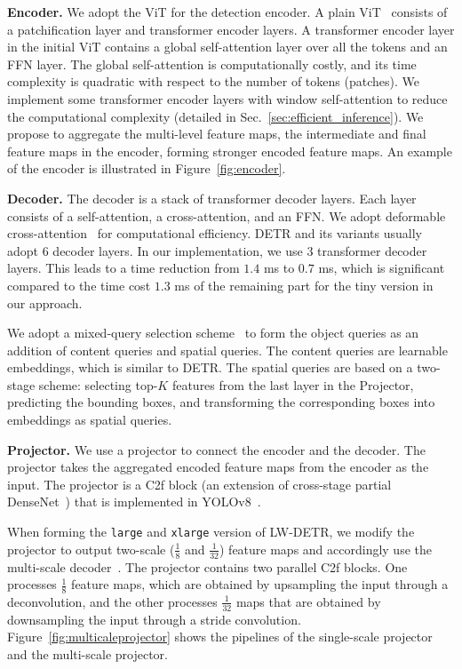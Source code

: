 \documentclass[runningheads]{llncs}
\begin{document}
\vspace{1mm}
\noindent\textbf{Encoder.} We adopt the ViT 
for the detection encoder. A plain ViT~\cite{dosovitskiy2020image} consists of a patchification layer and transformer encoder layers. 
A transformer encoder layer in the initial ViT contains a global self-attention layer over all the tokens and an FFN layer. 
The global self-attention is computationally costly, and its time complexity is quadratic with respect to the number of tokens (patches). We implement some transformer encoder layers with window self-attention to reduce the computational complexity (detailed in Sec.~\ref{sec:efficient_inference}). 
We propose to aggregate the multi-level feature maps, the intermediate and final feature maps in the encoder, forming stronger encoded feature maps. An example of the encoder is illustrated in Figure~\ref{fig:encoder}.

\vspace{1mm}
\noindent\textbf{Decoder.} 
The decoder is a stack of transformer decoder layers. Each layer consists of a self-attention, a cross-attention, and an FFN. 
We adopt deformable cross-attention~\cite{zhu2020deformable} for computational efficiency. 
DETR and its variants usually adopt $6$ decoder layers. In our implementation, we use $3$ transformer decoder layers. 
This leads to a time reduction from $1.4$ ms to $0.7$ ms, 
which is significant compared to the time cost $1.3$ ms of the remaining part for the tiny version in our approach.

We adopt a mixed-query selection scheme~\cite{zhang2022dino} to form the object queries as an addition of content queries and spatial queries. The content queries are learnable embeddings, which is similar to DETR. 
The spatial queries are based 
on a two-stage scheme: selecting top-$K$ features 
from the last layer in the Projector, predicting the bounding boxes,  
and transforming the corresponding boxes into embeddings as spatial queries.

\vspace{1mm}
\noindent\textbf{Projector.} We use a projector to connect the encoder and the decoder. The projector takes the aggregated encoded feature maps from the encoder as the input. The projector is a C2f block (an extension of cross-stage partial DenseNet~\cite{huang2017densely,wang2020cspnet}) that is implemented in YOLOv8~\cite{yolov8_ultralytics}.

When forming the \texttt{large} and \texttt{xlarge} version of LW-DETR, we modify the projector to output two-scale ($\frac{1}{8}$ and $\frac{1}{32}$) feature maps and accordingly use the multi-scale decoder~\cite{zhu2020deformable}. The projector contains two parallel C2f blocks. One processes $\frac{1}{8}$ feature maps, which are obtained by upsampling the input through a deconvolution, and the other processes $\frac{1}{32}$ maps that are obtained by downsampling the input through a stride convolution. Figure~\ref{fig:multicaleprojector} shows the pipelines of the single-scale projector and the multi-scale projector.
\end{document}
